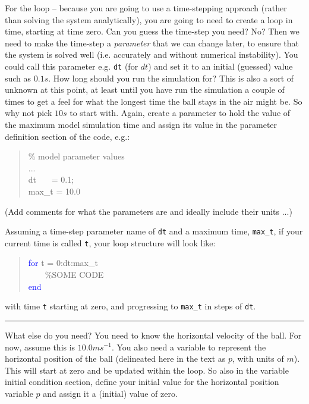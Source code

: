 \documentclass{tufte-book} %
\newenvironment{docspec}{\begin{quotation}\ttfamily\parskip0pt\parindent0pt\ignorespaces}{\end{quotation}}
\begin{document}
For the loop -- because you are going to use a time-stepping approach (rather than solving the system analytically), you are going to need to create a loop in time, starting at time zero. Can you guess the time-step you need? No? Then we need to make the time-step a \textit{parameter} that we can change later, to ensure that the system is solved well (i.e. accurately and without numerical instability). You could call this parameter e.g. \texttt{dt} (for \(dt\)) and set it to an initial (guessed) value such as \(0.1s\). How long should you run the simulation for? This is also a sort of unknown at this point, at least until you have run the simulation a couple of times to get a feel for what the longest time the ball stays in the air might be. So why not pick \(10s\) to start with. Again, create a parameter to hold the value of the maximum model simulation time and assign its value in the parameter definition section of the code, e.g.:
\begin{docspec}
\textcolor[rgb]{0,0.501961,0}{\% model parameter values}\\
...\\
dt \ \ \ = 0.1;\\
max\_t = 10.0
\end{docspec}
(Add comments for what the parameters are and ideally include their units ...)

\newpage
%
Assuming a time-step parameter name of \texttt{dt} and a maximum time, \texttt{max\_t}, if your current time is called \texttt{t}, your loop structure will look like:
\begin{docspec}
\textcolor{blue}{for} t = 0:dt:max\_t
\\ \ \ \ \ \textcolor[rgb]{0,0.501961,0}{\%SOME CODE}
\\\textcolor{blue}{end}
\end{docspec}
with time \texttt{t} starting at zero, and progressing to \texttt{max\_t} in steps of \texttt{dt}.

\vspace{1mm}
\noindent\rule{4cm}{0.5pt}
\vspace{2mm}

\noindent What else do you need? You  need to know the horizontal  velocity of the ball. For now, assume this is \(10.0ms^{-1}\). You also need a variable to represent the horizontal position of the ball (delineated here in the text as \(p\), with units of \(m\)). This will start at zero and be updated within the loop. So also in the variable initial condition section,  define your initial value for the horizontal position variable \(p\) and assign it a (initial) value of zero.
\end{document}
